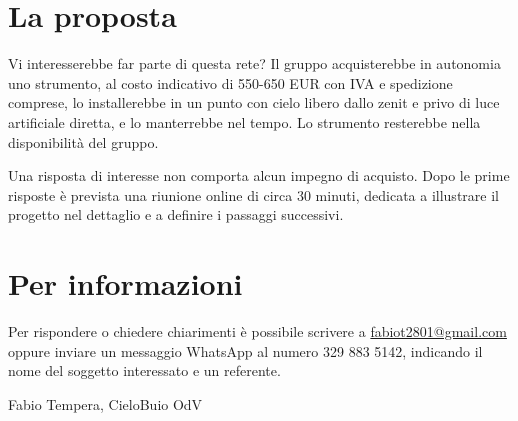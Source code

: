 \documentclass[11pt,a4paper]{report}
\begin{document}
\section*{La proposta}

Vi interesserebbe far parte di questa rete? Il gruppo acquisterebbe in autonomia uno strumento, al costo indicativo di 550-650 EUR con IVA e spedizione comprese, lo installerebbe in un punto con cielo libero dallo zenit e privo di luce artificiale diretta, e lo manterrebbe nel tempo. Lo strumento resterebbe nella disponibilità del gruppo.

Una risposta di interesse non comporta alcun impegno di acquisto. Dopo le prime risposte è prevista una riunione online di circa 30 minuti, dedicata a illustrare il progetto nel dettaglio e a definire i passaggi successivi.

\section*{Per informazioni}

Per rispondere o chiedere chiarimenti è possibile scrivere a \url{fabiot2801@gmail.com} oppure inviare un messaggio WhatsApp al numero 329 883 5142, indicando il nome del soggetto interessato e un referente.

\vspace{0.6cm}

\noindent Fabio Tempera, CieloBuio OdV
\end{document}
